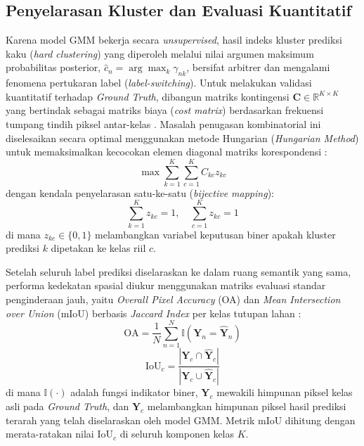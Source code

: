 \documentclass[11pt,twoside]{article}
\begin{document}
\subsection{Penyelarasan Kluster dan Evaluasi Kuantitatif}
Karena model GMM bekerja secara \textit{unsupervised}, hasil indeks kluster prediksi kaku (\textit{hard clustering}) yang diperoleh melalui nilai argumen maksimum probabilitas posterior, $\hat{c}_n = \arg\max_k \gamma_{nk}$, bersifat arbitrer dan mengalami fenomena pertukaran label (\textit{label-switching}). Untuk melakukan validasi kuantitatif terhadap \textit{Ground Truth}, dibangun matriks kontingensi $\mathbf{C} \in \mathbb{R}^{K \times K}$ yang bertindak sebagai matriks biaya (\textit{cost matrix}) berdasarkan frekuensi tumpang tindih piksel antar-kelas \cite{congalton1991review}. Masalah penugasan kombinatorial ini diselesaikan secara optimal menggunakan metode Hungarian (\textit{Hungarian Method}) untuk memaksimalkan kecocokan elemen diagonal matriks korespondensi \cite{kuhn1955hungarian}:
\begin{equation}
    \max \sum_{k=1}^{K} \sum_{c=1}^{K} C_{kc} z_{kc}
\end{equation}
dengan kendala penyelarasan satu-ke-satu (\textit{bijective mapping}):
\begin{equation}
    \sum_{k=1}^{K} z_{kc} = 1, \quad \sum_{c=1}^{K} z_{kc} = 1
\end{equation}
di mana $z_{kc} \in \{0, 1\}$ melambangkan variabel keputusan biner apakah kluster prediksi $k$ dipetakan ke kelas riil $c$.

Setelah seluruh label prediksi diselaraskan ke dalam ruang semantik yang sama, performa kedekatan spasial diukur menggunakan matriks evaluasi standar penginderaan jauh, yaitu \textit{Overall Pixel Accuracy} (OA) dan \textit{Mean Intersection over Union} (mIoU) berbasis \textit{Jaccard Index} per kelas tutupan lahan \cite{jaccard1912distribution}:
\begin{equation}
    \text{OA} = \frac{1}{N} \sum_{n=1}^{N} \mathbb{I}(\mathbf{Y}_n = \hat{\mathbf{Y}}_n)
\end{equation}
\begin{equation}
    \text{IoU}_c = \frac{|\mathbf{Y}_c \cap \hat{\mathbf{Y}}_c|}{|\mathbf{Y}_c \cup \hat{\mathbf{Y}}_c|}
\end{equation}
di mana $\mathbb{I}(\cdot)$ adalah fungsi indikator biner, $\mathbf{Y}_c$ mewakili himpunan piksel kelas asli pada \textit{Ground Truth}, dan $\hat{\mathbf{Y}}_c$ melambangkan himpunan piksel hasil prediksi terarah yang telah diselaraskan oleh model GMM. Metrik mIoU dihitung dengan merata-ratakan nilai $\text{IoU}_c$ di seluruh komponen kelas $K$.
\end{document}
